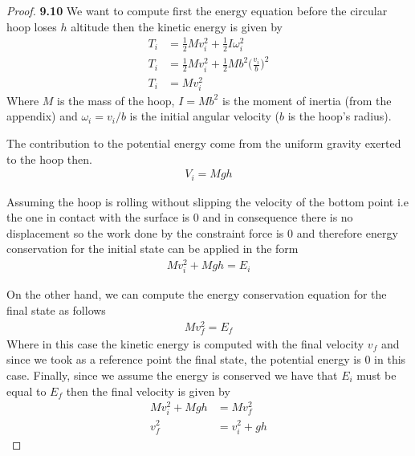 \documentclass[11pt]{article}
\theoremstyle{definition}
\begin{document}
\cleardoublepage
    \begin{proof}{\textbf{9.10}}
        We want to compute first the energy equation before the circular hoop
        loses $h$ altitude then the kinetic energy is given by
        \begin{align*}
            T_i &= \frac{1}{2}Mv_i^2 + \frac{1}{2}I\omega_i^2\\
            T_i &= \frac{1}{2}Mv_i^2 + \frac{1}{2}Mb^2\bigg(\frac{v_i}{b}\bigg)^2\\
            T_i &= Mv_i^2
        \end{align*}
        Where $M$ is the mass of the hoop, $I = Mb^2$ is the moment of inertia
        (from the appendix) and $\omega_i = v_i/b$ is the initial angular
        velocity ($b$ is the hoop's radius).

        The contribution to the potential energy come from the uniform gravity
        exerted to the hoop then.
        \begin{align*}
            V_i = Mgh
        \end{align*}

        Assuming the hoop is rolling without slipping the velocity of the
        bottom point i.e the one in contact with the surface is 0 and in
        consequence there is no displacement so the work done by the constraint
        force is 0 and therefore energy conservation for the initial
        state can be applied in the form
        \begin{align*}
            Mv_i^2 + Mgh = E_i
        \end{align*}

        On the other hand, we can compute the energy conservation equation for
        the final state as follows
        \begin{align*}
            Mv_f^2 = E_f
        \end{align*}
        Where in this case the kinetic energy is computed with the final
        velocity $v_f$ and since we took as a reference point the final state,
        the potential energy is 0 in this case.
        Finally, since we assume the energy is conserved we have that $E_i$
        must be equal to $E_f$ then the final velocity is given by
        \begin{align*}
            Mv_i^2 + Mgh &= Mv_f^2\\
            v_f^2 &= v_i^2 + gh
        \end{align*}  
    \end{proof}
\cleardoublepage
\end{document}
